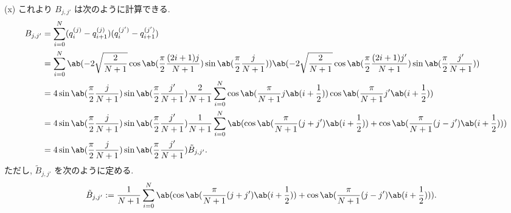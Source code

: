 \documentclass[uplatex,diffipdfmx,a4paper,11pt]{jlreq}
\theoremstyle{definition}
\begin{document}
(x) これより $B_{j,j'}$ は次のように計算できる.
\begin{align}
  B_{j,j'} & = \sum_{i=0}^{N}(q_i^{(j)} - q_{i+1}^{(j)})(q_i^{(j')} - q_{i+1}^{(j')})                                                                                                                                                         \\
           & = \sum_{i=0}^{N}\ab(-2\sqrt{\frac{2}{N+1}}\cos\ab(\frac{\pi}{2}\frac{(2i+1)j}{N+1})\sin\ab(\frac{\pi}{2}\frac{j}{N+1}))\ab(-2\sqrt{\frac{2}{N+1}}\cos\ab(\frac{\pi}{2}\frac{(2i+1)j'}{N+1})\sin\ab(\frac{\pi}{2}\frac{j'}{N+1})) \\
           & = 4\sin\ab(\frac{\pi}{2}\frac{j}{N+1})\sin\ab(\frac{\pi}{2}\frac{j'}{N+1})\frac{2}{N+1}\sum_{i=0}^{N}\cos\ab(\frac{\pi}{N+1}j\ab(i + \frac{1}{2}))\cos\ab(\frac{\pi}{N+1}j'\ab(i + \frac{1}{2}))                                 \\
           & = 4\sin\ab(\frac{\pi}{2}\frac{j}{N+1})\sin\ab(\frac{\pi}{2}\frac{j'}{N+1})\frac{1}{N+1}\sum_{i=0}^{N}\ab(\cos\ab(\frac{\pi}{N+1}(j + j')\ab(i + \frac{1}{2})) + \cos\ab(\frac{\pi}{N+1}(j - j')\ab(i + \frac{1}{2})))            \\
           & = 4\sin\ab(\frac{\pi}{2}\frac{j}{N+1})\sin\ab(\frac{\pi}{2}\frac{j'}{N+1})\tilde{B}_{j,j'}.
\end{align}
ただし, $\tilde{B}_{j,j'}$ を次のように定める.
\begin{align}
  \tilde{B}_{j,j'} & := \frac{1}{N+1}\sum_{i=0}^{N}\ab(\cos\ab(\frac{\pi}{N+1}(j + j')\ab(i + \frac{1}{2})) + \cos\ab(\frac{\pi}{N+1}(j - j')\ab(i + \frac{1}{2}))).
\end{align}
\end{document}
